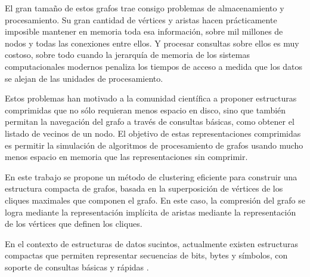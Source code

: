 El gran tamaño de estos grafos trae consigo problemas de almacenamiento y procesamiento. Su gran cantidad de vértices y aristas hacen prácticamente imposible mantener en memoria toda esa información, sobre mil millones de nodos y todas las conexiones entre ellos. Y procesar consultas sobre ellos es muy costoso, sobre todo cuando la jerarquía de memoria de los sistemas computacionales modernos penaliza los tiempos de acceso a medida que los datos se alejan de las unidades de procesamiento.

Estos problemas han motivado a la comunidad científica a proponer estructuras comprimidas que no sólo requieran menos espacio en disco, sino que también permitan la navegación del grafo a través de consultas básicas, como obtener el listado de vecinos de un nodo. El objetivo de estas representaciones comprimidas es permitir la simulación de algoritmos de procesamiento de grafos usando mucho menos espacio en memoria que las representaciones sin comprimir.

En este trabajo se propone un método de clustering eficiente para construir una estructura compacta de grafos, basada en la superposición de vértices de los cliques maximales que componen el grafo. En este caso, la compresión del grafo se logra mediante la representación implícita de aristas mediante la representación de los vértices que definen los cliques.

En el contexto de estructuras de datos sucintos, actualmente existen estructuras compactas que permiten representar secuencias de bits, bytes y símbolos, con soporte de consultas básicas y rápidas \cite{raman2002succinct, grossi2003high, claude2015wavelet}.



